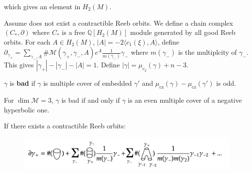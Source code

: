 \begin{center}
\end{center}

which gives an element in $H_2(M)$.

Assume does not exist a contractible Reeb orbits. We define a chain complex $(C_*, \partial)$ where $C_*$ is a free $\mathbb{Q}[H_2(M)]$ module generated by all good Reeb orbits. For each $A\in H_2(M)$, $| A|  = -2 \langle c_1(\xi), A \rangle$, define $\partial_{\gamma_+}= \sum_{\gamma_-, A}\# \mathcal{M}(\gamma_+, \gamma_-, A) e^A \frac{1}{m(\gamma_-)}\gamma_-$ where $m(\gamma_-)$ is the multiplcity of $\gamma_-$. This gives $|\gamma_+| -| \gamma_- | -| A| =1$. Define $| \gamma| =\mu_{c_2}(\gamma)+n-3$.

\begin{definition}

$\gamma$ is \textbf{bad} if $\gamma$ is multiple cover of embedded $\gamma'$ and $\mu_{\text{cz}}(\gamma)-\mu_{\text{cz}}(\gamma')$ is odd.

\end{definition}

\begin{example}

For $\dim \mathcal{M}=3$, $\gamma$ is bad if and only if $\gamma$ is an even multiple cover of a negative hyperbolic one.

\end{example}

If there exists a contractible Reeb orbits:
\vspace{-20pt}
\begin{figure}[htbp]
  \centering
  \includegraphics[width=1\textwidth]{images/bao1.png}
  \label{fig:bi14}
\end{figure}
\vspace{-40pt} %

